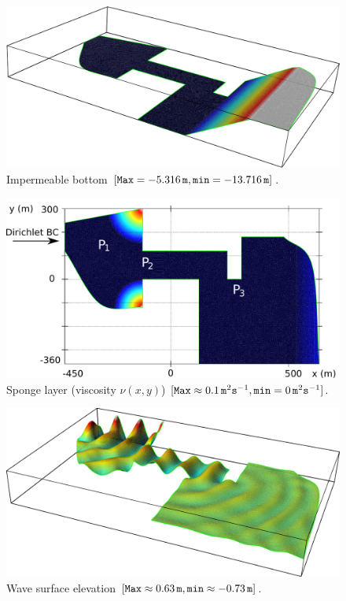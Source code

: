 \begin{figure}
\begin{center}
\includegraphics[width=\largefig]{chapters/lopes/pdf/depth.pdf}
\end{center}
\caption{Impermeable bottom $[{\tt Max}=-5.316\,{\tt m},{\tt
      min}=-13.716\,{\tt m}]$.}
\label{fig:lopes:harbor_depth}
\end{figure}
\begin{figure}
\begin{center}
\includegraphics[width=\largefig]{chapters/lopes/pdf/sponge.pdf}
\end{center}
\caption{Sponge layer (viscosity $\nu(x,y)$) $[{\tt Max}
    \approx 0.1\,{\tt m}^2{\tt s}^{-1}, {\tt min}=0 \,{\tt
      m}^2{\tt s}^{-1}]$.}
\label{fig:lopes:sponge}
\end{figure}
\begin{figure}
\begin{center}
\includegraphics[width=\largefig]{chapters/lopes/pdf/eta.pdf}
\end{center}
\caption{Wave surface elevation $[{\tt Max}\approx 0.63\,{\tt m},
    {\tt min}\approx-0.73\,{\tt m}] $.}
\label{fig:lopes:elevation}
\end{figure}
